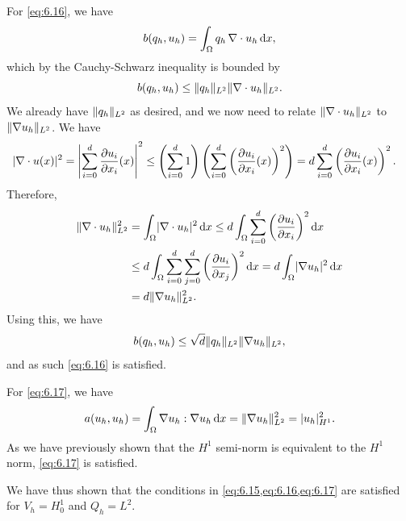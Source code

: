 \begin{solution}{6.1}
    For \cref{eq:6.16}, we have
    \begin{equation}
        b(q_h, u_h) = \int_{\Omega} q_h \, \nabla \cdot u_h \diff x,
    \end{equation}
    which by the Cauchy-Schwarz inequality is bounded by
    \begin{equation}
        b(q_h, u_h) \leq \norm{q_h}_{L^2} \norm{\nabla \cdot u_h}_{L^2}.
    \end{equation}
    We already have $\norm{q_h}_{L^2}$ as desired, and we now need to relate $\norm{\nabla \cdot u_h}_{L^2}$ to $\norm{\nabla u_h}_{L^2}$.
    We have
    \begin{align*}
        \abs{\nabla \cdot u(x)}^2
        &= \abs*{\sum_{i = 0}^{d} \frac{\partial u_i}{\partial x_i}(x)}^2
        \leq \left(
            \sum_{i = 0}^{d} 1
        \right) \left(
            \sum_{i = 0}^{d} \left( \frac{\partial u_i}{\partial x_i}(x) \right)^2
        \right)
        = d \sum_{i = 0}^{d} \left( \frac{\partial u_i}{\partial x_i}(x) \right)^2.
    \end{align*}
    Therefore,
    \begin{align*}
        \norm{\nabla \cdot u_h}_{L^2}^2
        &= \int_{\Omega} \abs{\nabla \cdot u_h}^2 \diff x
        \leq d \int_{\Omega} \sum_{i = 0}^{d} \left(
            \frac{\partial u_i}{\partial x_i}
        \right)^2 \diff x \\
        &\leq d \int_{\Omega} \sum_{i = 0}^{d} \sum_{j = 0}^{d} \left(
            \frac{\partial u_i}{\partial x_j}
        \right)^2 \diff x
        = d \int_{\Omega} \abs{\nabla u_h}^2 \diff x \\
        &= d \norm{\nabla u_h}_{L^2}^2.
    \end{align*}
    Using this, we have
    \begin{equation}
        b(q_h, u_h) \leq \sqrt{d} \norm{q_h}_{L^2} \norm{\nabla u_h}_{L^2},
    \end{equation}
    and as such \cref{eq:6.16} is satisfied.

    For \cref{eq:6.17}, we have
    \begin{equation}
        a(u_h, u_h)
        = \int_{\Omega} \nabla u_h : \nabla u_h \diff x
        = \norm{\nabla u_h}_{L^2}^2 = \abs{u_h}_{H^1}^2.
    \end{equation}
    As we have previously shown that the $H^1$ semi-norm is equivalent to the $H^1$ norm, \cref{eq:6.17} is satisfied.

    We have thus shown that the conditions in \cref{eq:6.15,eq:6.16,eq:6.17} are satisfied for $V_h = H^1_0$ and $Q_h = L^2$.
\end{solution}

